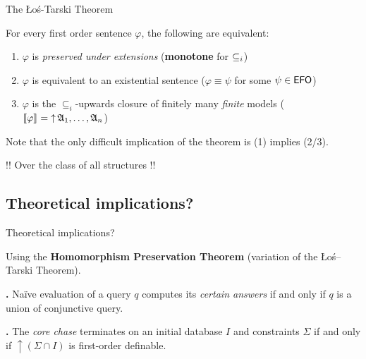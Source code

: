 \documentclass{beamer}
\begin{document}
\begin{frame}{The Łoś-Tarski Theorem}
    \begin{theorem}
        \vspace{0.1em}
        For every first order
        sentence \(\varphi\), the following are equivalent:
        \begin{enumerate}
        \item
            \(\varphi\) is \emph{preserved under extensions}
            \hfill
            (\textbf{monotone} for $\mathrel{\subseteq_i}$)
        \item
          \(\varphi\) is equivalent to an existential sentence
          \hfill
          ($\varphi \equiv \psi$ for some $\psi \in \mathsf{EFO}$)
        \item
          \(\varphi\) is the \(\subseteq_i\)-upwards closure of finitely many
          \emph{finite} models
          \hfill
          ($\modset{\varphi} = \upset{\model{A}_1, \dots, \model{A}_n}$)
        \end{enumerate}
    \end{theorem}
    \pause
    Note that the only difficult implication of the theorem is (1) implies
    (2/3).
    \pause
    \begin{alertblock}{!! Over the class of all structures !!}
    \end{alertblock}
\end{frame}

\subsection{Theoretical implications?}\label{theoretical-implications}

\begin{frame}{Theoretical implications?}

    Using the \textbf{Homomorphism Preservation Theorem}
    (variation of the Łoś--Tarski Theorem).

    \textbf{\autocite[Proposition 1]{LIBK11}.} Naïve evaluation of a query
    \(q\) computes its \emph{certain answers} if and only if \(q\) is a
    union of conjunctive query.

    \textbf{\autocite[Theorem 17]{DENJ08}.} The \emph{core chase} terminates
    on an initial database \(I\) and constraints \(\Sigma\) if and only if
    \(\mathop{\uparrow}(\Sigma \cap I)\) is first-order definable.

\end{frame}
\end{document}
